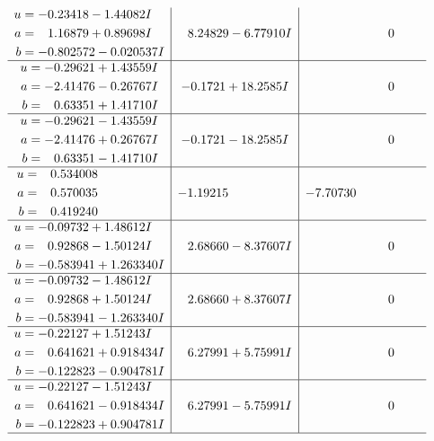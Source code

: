 \documentclass[1p]{elsarticle_modified}
\theoremstyle{definition}
\begin{document}
$$\begin{array}{c|c|c}
\begin{aligned}
u &= -0.23418 - 1.44082 I \\
a &= \phantom{-}1.16879 + 0.89698 I \\
b &= -0.802572 - 0.020537 I\end{aligned}
 & \phantom{-}8.24829 - 6.77910 I & \phantom{-0.000000 } 0 \\ \hline\begin{aligned}
u &= -0.29621 + 1.43559 I \\
a &= -2.41476 - 0.26767 I \\
b &= \phantom{-}0.63351 + 1.41710 I\end{aligned}
 & -0.1721 + 18.2585 I & \phantom{-0.000000 } 0 \\ \hline\begin{aligned}
u &= -0.29621 - 1.43559 I \\
a &= -2.41476 + 0.26767 I \\
b &= \phantom{-}0.63351 - 1.41710 I\end{aligned}
 & -0.1721 - 18.2585 I & \phantom{-0.000000 } 0 \\ \hline\begin{aligned}
u &= \phantom{-}0.534008\phantom{ +0.000000I} \\
a &= \phantom{-}0.570035\phantom{ +0.000000I} \\
b &= \phantom{-}0.419240\phantom{ +0.000000I}\end{aligned}
 & -1.19215\phantom{ +0.000000I} & -7.70730\phantom{ +0.000000I} \\ \hline\begin{aligned}
u &= -0.09732 + 1.48612 I \\
a &= \phantom{-}0.92868 - 1.50124 I \\
b &= -0.583941 + 1.263340 I\end{aligned}
 & \phantom{-}2.68660 - 8.37607 I & \phantom{-0.000000 } 0 \\ \hline\begin{aligned}
u &= -0.09732 - 1.48612 I \\
a &= \phantom{-}0.92868 + 1.50124 I \\
b &= -0.583941 - 1.263340 I\end{aligned}
 & \phantom{-}2.68660 + 8.37607 I & \phantom{-0.000000 } 0 \\ \hline\begin{aligned}
u &= -0.22127 + 1.51243 I \\
a &= \phantom{-}0.641621 + 0.918434 I \\
b &= -0.122823 - 0.904781 I\end{aligned}
 & \phantom{-}6.27991 + 5.75991 I & \phantom{-0.000000 } 0 \\ \hline\begin{aligned}
u &= -0.22127 - 1.51243 I \\
a &= \phantom{-}0.641621 - 0.918434 I \\
b &= -0.122823 + 0.904781 I\end{aligned}
 & \phantom{-}6.27991 - 5.75991 I & \phantom{-0.000000 } 0\\
 \hline 
 \end{array}$$\newpage\newpage\renewcommand{\arraystretch}{1}
\end{document}
